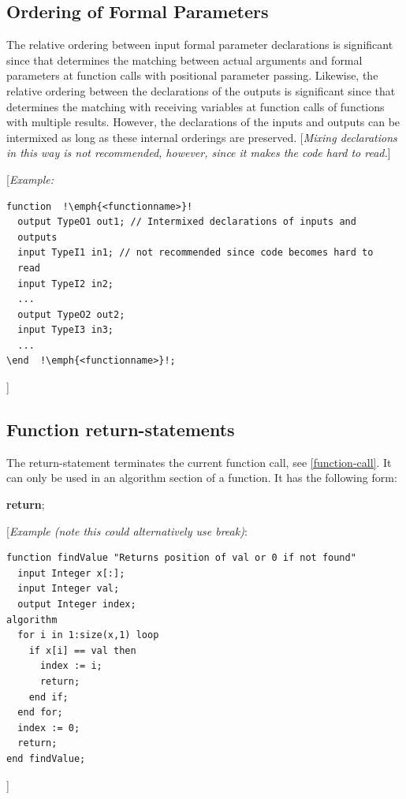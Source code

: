 \documentclass[10pt,a4paper]{report}
\def\doublelabel#1{\label{#1}\hypertarget{#1}{}}
\begin{document}
\subsection{Ordering of Formal Parameters}\doublelabel{ordering-of-formal-parameters}

The relative ordering between input formal parameter declarations is
significant since that determines the matching between actual arguments
and formal parameters at function calls with positional parameter
passing. Likewise, the relative ordering between the declarations of the
outputs is significant since that determines the matching with receiving
variables at function calls of functions with multiple results. However,
the declarations of the inputs and outputs can be intermixed as long as
these internal orderings are preserved. {[}\emph{Mixing declarations in
this way is not recommended, however, since it makes the code hard to
read.}{]}

{[}\emph{Example:}



\begin{lstlisting}[language=modelica]
function  !\emph{<functionname>}!
  output TypeO1 out1; // Intermixed declarations of inputs and
  outputs
  input TypeI1 in1; // not recommended since code becomes hard to
  read
  input TypeI2 in2;
  ...
  output TypeO2 out2;
  input TypeI3 in3;
  ...
\end  !\emph{<functionname>}!;
\end{lstlisting}

{]}

\subsection{Function return-statements}\doublelabel{function-return-statements}

The return-statement terminates the current function call, see \ref{function-call}. 
It can only be used in an algorithm section of a function. It has
the following form:

\textbf{return};

{[}\emph{Example (note this could alternatively use break)}:

\begin{lstlisting}[language=modelica]
function findValue "Returns position of val or 0 if not found"
  input Integer x[:];
  input Integer val;
  output Integer index;
algorithm
  for i in 1:size(x,1) loop
    if x[i] == val then
      index := i;
      return;
    end if;
  end for;
  index := 0;
  return;
end findValue;
\end{lstlisting}
{]}
\end{document}
